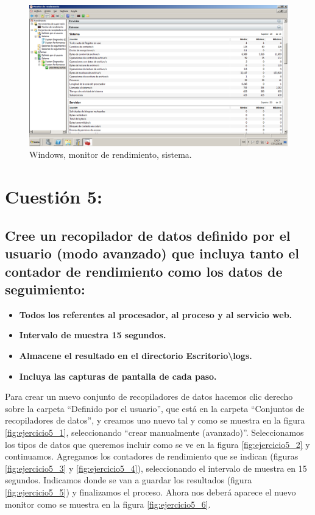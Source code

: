 \begin{figure}[H] 
	\centering
	\includegraphics[width=14.7cm]{./img/ejercicio4_5.png} 	
	\caption{Windows, monitor de rendimiento, sistema.} \label{fig:ejercicio4_5}
\end{figure}




\section{Cuestión 5:}
\subsection{Cree un recopilador de datos definido por el usuario (modo avanzado) que incluya tanto el contador de rendimiento como los datos de seguimiento:}

\begin{itemize}
	\item \textbf{Todos los referentes al procesador, al proceso y al servicio web.}
	\item \textbf{Intervalo de muestra 15 segundos.}
	\item \textbf{Almacene el resultado en el directorio Escritorio\textbackslash logs.}
	\item \textbf{Incluya las capturas de pantalla de cada paso.}
\end{itemize}


Para crear un nuevo conjunto de recopiladores de datos hacemos clic derecho sobre la carpeta ``Definido por el usuario'', que está en la carpeta ``Conjuntos de recopiladores de datos'', y creamos uno nuevo tal y como se muestra en la figura \ref{fig:ejercicio5_1}, seleccionando ``crear manualmente (avanzado)''. Seleccionamos los tipos de datos que queremos incluir como se ve en la figura \ref{fig:ejercicio5_2} y continuamos. Agregamos los contadores de rendimiento que se indican (figuras \ref{fig:ejercicio5_3} y \ref{fig:ejercicio5_4}), seleccionando el intervalo de muestra en 15 segundos. Indicamos donde se van a guardar los resultados (figura \ref{fig:ejercicio5_5}) y finalizamos el proceso. Ahora nos deberá aparece el nuevo monitor como se muestra en la figura \ref{fig:ejercicio5_6}.


